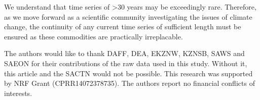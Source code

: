 \documentclass[]{ametsoc}
\begin{document}
We understand that time series of \textgreater 30 years may be exceedingly rare. Therefore, as we move forward as a scientific community investigating the issues of climate change, the continuity of any current time series of sufficient length must be ensured as these commodities are practically irreplacable.
%

\acknowledgments
The authors would like to thank DAFF, DEA, EKZNW, KZNSB, SAWS and SAEON for their contributions of the raw data used in this study. Without it, this article and the SACTN would not be possible. This research was supported by NRF Grant (CPRR14072378735). The authors report no financial conflicts of interests.

%







\end{document}
